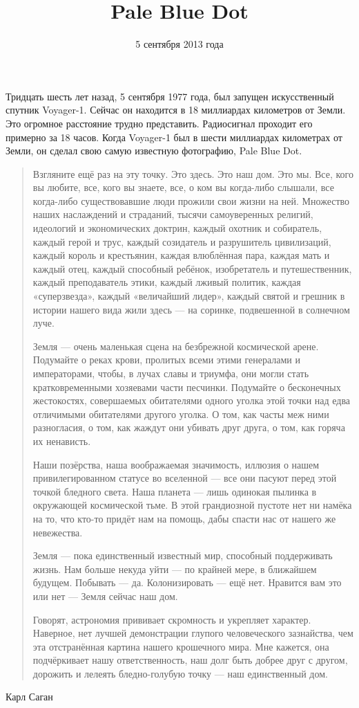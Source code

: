 \documentclass[pdftex,12pt,a4paper]{article}
\title{Pale Blue Dot}
\author{5 сентября 2013 года}
\date{}
\begin{document}

\begin{titlepage}

\maketitle

{\footnotesize  Тридцать шесть лет назад, 5 сентября 1977 года, был запущен искусственный спутник Voyager-1. Сейчас он находится в 18 миллиардах километров от Земли. Это огромное расстояние трудно представить. Радиосигнал проходит его примерно за 18 часов. Когда Voyager-1 был в шести миллиардах километрах от Земли, он сделал свою самую известную фотографию, Pale Blue Dot. }

\bigskip 

\begin{quotation}
Взгляните ещё раз на эту точку. Это здесь. Это наш дом. Это мы. Все, кого вы любите, все, кого вы знаете, все, о ком вы когда-либо слышали, все когда-либо существовавшие люди прожили свои жизни на ней. Множество наших наслаждений и страданий, тысячи самоуверенных религий, идеологий и экономических доктрин, каждый охотник и собиратель, каждый герой и трус, каждый созидатель и разрушитель цивилизаций, каждый король и крестьянин, каждая влюблённая пара, каждая мать и каждый отец, каждый способный ребёнок, изобретатель и путешественник, каждый преподаватель этики, каждый лживый политик, каждая «суперзвезда», каждый «величайший лидер», каждый святой и грешник в истории нашего вида жили здесь — на соринке, подвешенной в солнечном луче.

Земля — очень маленькая сцена на безбрежной космической арене. Подумайте о реках крови, пролитых всеми этими генералами и императорами, чтобы, в лучах славы и триумфа, они могли стать кратковременными хозяевами части песчинки. Подумайте о бесконечных жестокостях, совершаемых обитателями одного уголка этой точки над едва отличимыми обитателями другого уголка. О том, как часты меж ними разногласия, о том, как жаждут они убивать друг друга, о том, как горяча их ненависть.

Наши позёрства, наша воображаемая значимость, иллюзия о нашем привилегированном статусе во вселенной — все они пасуют перед этой точкой бледного света. Наша планета — лишь одинокая пылинка в окружающей космической тьме. В этой грандиозной пустоте нет ни намёка на то, что кто-то придёт нам на помощь, дабы спасти нас от нашего же невежества.

Земля — пока единственный известный мир, способный поддерживать жизнь. Нам больше некуда уйти — по крайней мере, в ближайшем будущем. Побывать — да. Колонизировать — ещё нет. Нравится вам это или нет — Земля сейчас наш дом.

Говорят, астрономия прививает скромность и укрепляет характер. Наверное, нет лучшей демонстрации глупого человеческого зазнайства, чем эта отстранённая картина нашего крошечного мира. Мне кажется, она подчёркивает нашу ответственность, наш долг быть добрее друг с другом, дорожить и лелеять бледно-голубую точку — наш единственный дом.
\end{quotation}
Карл Саган

\end{titlepage}
\end{document}
